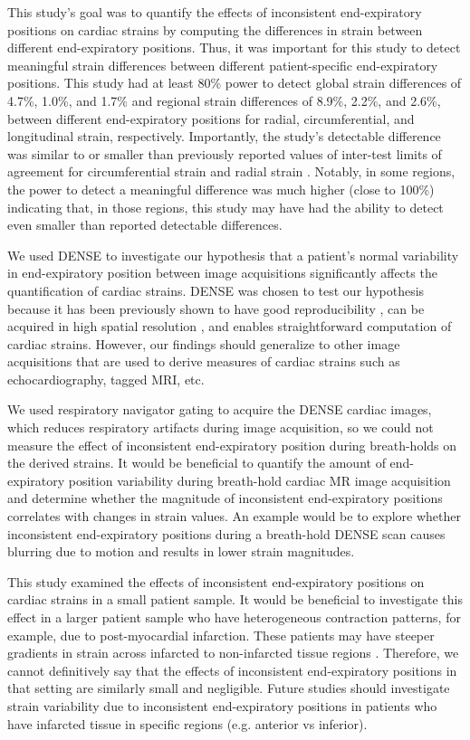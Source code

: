 	This study’s goal was to quantify the effects of inconsistent end-expiratory positions on cardiac strains by computing the differences in strain between different end-expiratory positions. Thus, it was important for this study to detect meaningful strain differences between different patient-specific end-expiratory positions. This study had at least 80\% power to detect global strain differences of 4.7\%, 1.0\%, and 1.7\% and regional strain differences of 8.9\%, 2.2\%, and 2.6\%, between different end-expiratory positions for radial, circumferential, and longitudinal strain, respectively. Importantly, the study’s detectable difference was similar to or smaller than previously reported values of inter-test limits of agreement for circumferential strain and radial strain \cite{Wehner2015a}. Notably, in some regions, the power to detect a meaningful difference was much higher (close to 100\%) indicating that, in those regions, this study may have had the ability to detect even smaller than reported detectable differences.
	
	We used DENSE to investigate our hypothesis that a patient’s normal variability in end-expiratory position between image acquisitions significantly affects the quantification of cardiac strains. DENSE was chosen to test our hypothesis because it has been previously shown to have good reproducibility \cite{Haggerty2013}, can be acquired in high spatial resolution \cite{Aletras1999b,Aletras1999c}, and enables straightforward computation of cardiac strains. However, our findings should generalize to other image acquisitions that are used to derive measures of cardiac strains such as echocardiography, tagged MRI, etc.
	
	We used respiratory navigator gating to acquire the DENSE cardiac images, which reduces respiratory artifacts during image acquisition, so we could not measure the effect of inconsistent end-expiratory position during breath-holds on the derived strains. It would be beneficial to quantify the amount of end-expiratory position variability during breath-hold cardiac MR image acquisition and determine whether the magnitude of inconsistent end-expiratory positions correlates with changes in strain values. An example would be to explore whether inconsistent end-expiratory positions during a breath-hold DENSE scan causes blurring due to motion and results in lower strain magnitudes.
	
	This study examined the effects of inconsistent end-expiratory positions on cardiac strains in a small patient sample. It would be beneficial to investigate this effect in a larger patient sample who have heterogeneous contraction patterns, for example, due to post-myocardial infarction. These patients may have steeper gradients in strain across infarcted to non-infarcted tissue regions \cite{Pahlm2014}. Therefore, we cannot definitively say that the effects of inconsistent end-expiratory positions in that setting are similarly small and negligible. Future studies should investigate strain variability due to inconsistent end-expiratory positions in patients who have infarcted tissue in specific regions (e.g. anterior vs inferior).
	
